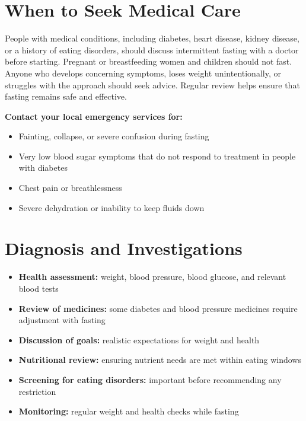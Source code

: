 \section*{When to Seek Medical Care}
People with medical conditions, including diabetes, heart disease, kidney disease, or a history of eating disorders, should discuss intermittent fasting with a doctor before starting. Pregnant or breastfeeding women and children should not fast. Anyone who develops concerning symptoms, loses weight unintentionally, or struggles with the approach should seek advice. Regular review helps ensure that fasting remains safe and effective.

\textbf{Contact your local emergency services for:}
\begin{itemize}
    \item Fainting, collapse, or severe confusion during fasting
    \item Very low blood sugar symptoms that do not respond to treatment in people with diabetes
    \item Chest pain or breathlessness
    \item Severe dehydration or inability to keep fluids down
\end{itemize}

\section*{Diagnosis and Investigations}
\begin{itemize}
    \item \textbf{Health assessment:} weight, blood pressure, blood glucose, and relevant blood tests
    \item \textbf{Review of medicines:} some diabetes and blood pressure medicines require adjustment with fasting
    \item \textbf{Discussion of goals:} realistic expectations for weight and health
    \item \textbf{Nutritional review:} ensuring nutrient needs are met within eating windows
    \item \textbf{Screening for eating disorders:} important before recommending any restriction
    \item \textbf{Monitoring:} regular weight and health checks while fasting
\end{itemize}

